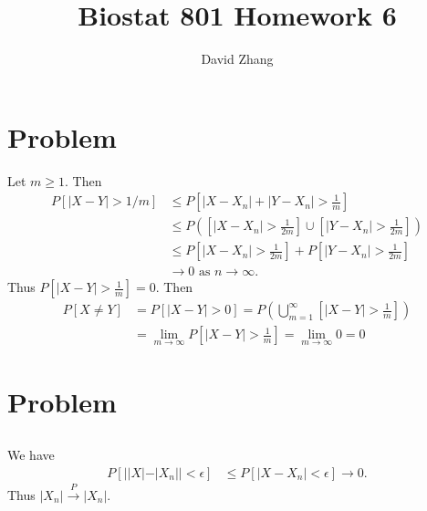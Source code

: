 \documentclass{article}[12pt]
\title{Biostat 801 Homework 6}
\author{David Zhang}
\newcommand{\pto}{\overset{P}{\to}}
\begin{document}
\maketitle

\section{Problem}

Let $m \geq 1$.
Then
\begin{align*}
  P[|X-Y| > 1/m]
  & \leq P[|X-X_n| + |Y-X_n| > \frac{1}{m}] \\
  & \leq P([|X-X_n| > \frac{1}{2m}] \cup [|Y-X_n| > \frac{1}{2m}]) \\
  & \leq P[|X-X_n| > \frac{1}{2m}] + P[|Y-X_n| > \frac{1}{2m}] \\
  & \to 0 \text{ as } n \to \infty.
\end{align*}
Thus $P[|X-Y| > \frac{1}{m}] = 0$.
Then
\begin{align*}
  P[X \neq Y]
  & = P[|X-Y|>0]
    = P(\bigcup_{m=1}^\infty [|X-Y| > \frac{1}{m}]) \\
  & = \lim_{m \to \infty} P[|X-Y| > \frac{1}{m}]
    = \lim_{m \to \infty} 0
    = 0
\end{align*}

\section{Problem}

\subsection{}

We have
\begin{align*}
  P[||X|-|X_n|| < \epsilon]
  & \leq P[|X - X_n| < \epsilon]
    \to 0.
\end{align*}
Thus $|X_n| \pto |X_n|$.

\subsection{}
\end{document}
